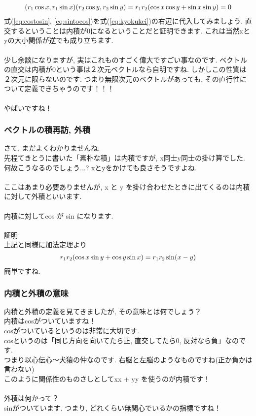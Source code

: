 \documentclass[11pt,a4paper]{jsarticle}
\begin{document}
\begin{eqnarray}
(\mathstrut r_1\cos x, \mathstrut r_1\sin x)(\mathstrut r_2\cos y, \mathstrut r_2\sin y) = \mathstrut r_1\mathstrut r_2(\cos x\cos y + \sin x\sin y) = 0
\label{eq:kyokukei}
\end{eqnarray}
式(\ref{eq:costosin}, \ref{eq:sintocos})を式(\ref{eq:kyokukei})の右辺に代入してみましょう. 直交するということは内積が0になるということだと証明できます. これは当然xとyの大小関係が逆でも成り立ちます. \\
\\
少し余談になりますが, 実はこれものすごく偉大ですごい事なのです. ベクトルの直交は内積が0という事は２次元ベクトルなら自明ですね. しかしこの性質は２次元に限らないのです. つまり無限次元のベクトルがあっても, その直行性について定義できちゃうのです！！！\\
\\
やばいですね！\\


\subsubsection{ベクトルの積再訪, 外積}
さて, まだよくわかりませんね. \\
先程てきとうに書いた「素朴な積」は内積ですが, x同士y同士の掛け算でした.\\
何故こうなるのでしょう...? xとyをかけても良さそうですよね.\\
\\
ここはあまり必要ありませんが, x と y を掛け合わせたときに出てくるのは内積に対して外積といいます.\\
\\
内積に対してcos が sin になります.
\\
\\
証明\\
上記と同様に加法定理より\\
\begin{eqnarray}
\mathstrut r_1\mathstrut r_2(\cos x\sin y + \cos y\sin x) = \mathstrut r_1\mathstrut r_2\sin (x-y)
\end{eqnarray}
簡単ですね.


\subsubsection{内積と外積の意味}
内積と外積の定義を見てきましたが, その意味とは何でしょう？\\
内積はcosがついていますね！\\
cosがついているというのは非常に大切です.\\
cosというのは「同じ方向を向いてたら正, 直交してたら0, 反対なら負」なのです.\\
つまり以心伝心～犬猿の仲なのです. 右脳と左脳のようなものですね(正か負かは言わない)\\
このように関係性のものさしとしてxx + yy を使うのが内積です！\\
\\
外積は何かって？\\
sinがついています. つまり, どれくらい無関心でいるかの指標ですね！
\end{document}
